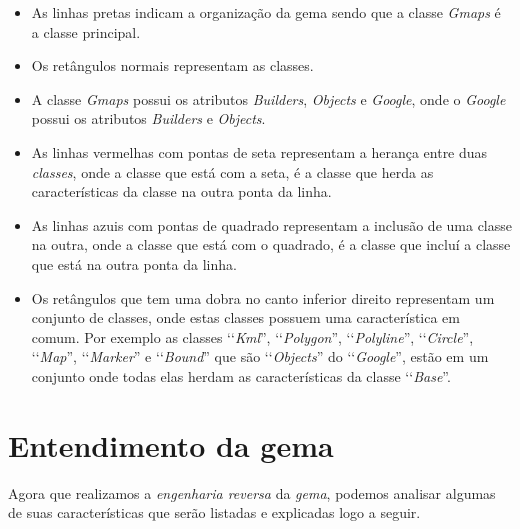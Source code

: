 \begin{itemize}

 \item As linhas pretas indicam a organização da gema sendo que a classe \emph{Gmaps} é a classe principal.
 
 \item Os retângulos normais representam as classes.
 
 \item A classe \emph{Gmaps} possui os atributos \emph{Builders}, \emph{Objects} e 
 \emph{Google}, onde o \emph{Google} possui os atributos \emph{Builders} e \emph{Objects}.
 
 \item As linhas vermelhas com pontas de seta representam a herança entre duas \emph{classes}, onde 
 a classe que está com a seta, é a classe que herda as características da classe
 na outra ponta da linha.

 \item As linhas azuis com pontas de quadrado representam a inclusão de uma classe na outra, onde
 a classe que está com o quadrado, é a classe que incluí a classe que está na outra ponta da linha.
 
  \item Os retângulos que tem uma dobra no canto inferior direito representam um conjunto de classes, 
 onde estas classes possuem uma característica em comum. Por exemplo as classes ‘‘\emph{Kml}'', 
 ‘‘\emph{Polygon}'', ‘‘\emph{Polyline}'', ‘‘\emph{Circle}'', ‘‘\emph{Map}'', ‘‘\emph{Marker}'' e 
 ‘‘\emph{Bound}'' que são ‘‘\emph{Objects}'' do ‘‘\emph{Google}'', estão em um conjunto onde todas elas 
 herdam as características da classe ‘‘\emph{Base}''.
 
 \end{itemize}
 
 
\section{Entendimento da gema} 
\label{section:entendimento_da_gema} 

Agora que realizamos a \emph{engenharia reversa} da \emph{gema}, podemos analisar algumas de suas 
características que serão listadas e explicadas logo a seguir.


